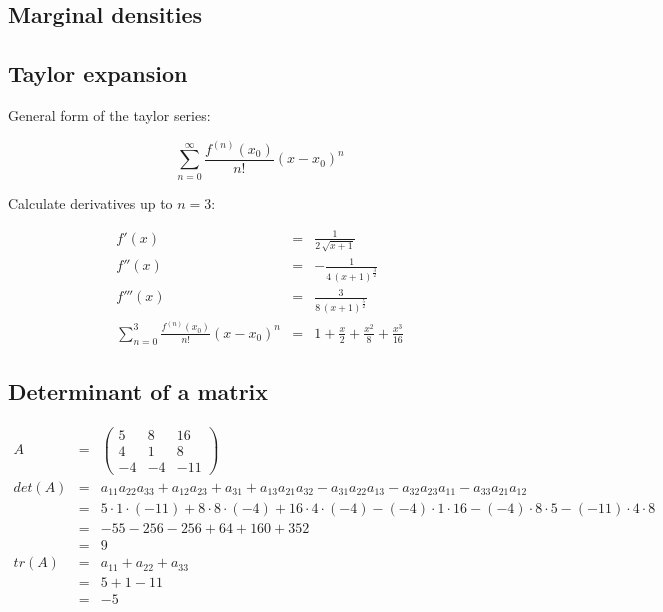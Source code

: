 \documentclass[11pt,a4paper]{article}
\begin{document}
\subsection{Marginal densities}

\subsection{Taylor expansion}

General form of the taylor series:

\begin{displaymath}
\sum_{n=0}^\infty \frac{f^{(n)}(x_0)}{n!} (x - x_0)^n
\end{displaymath}

Calculate derivatives up to $n=3$:

\begin{eqnarray*}
f'(x)   &   = & \frac{1}{2 \, \sqrt{x + 1}}\\
f''(x)  &   = & - \frac{1}{4 \, (x + 1)^\frac{3}{2}}\\
f'''(x) &   = & \frac{3}{8 \, (x + 1)^\frac{5}{2}}\\
\sum_{n=0}^3 \frac{f^{(n)}(x_0)}{n!} (x - x_0)^n
        &   = & 1 + \frac{x}{2} + \frac{x^2}{8} + \frac{x^3}{16}
\end{eqnarray*}

\subsection{Determinant of a matrix}

\begin{eqnarray*}
A   &   = & \begin{pmatrix}
  5 &   8 &  16\\
  4 &   1 &   8\\
 -4 &  -4 & -11
\end{pmatrix}\\
det(A)  &   = & a_{11} a_{22} a_{33} + a_{12} a_{23} + a_{31} + a_{13} a_{21} a_{32}
            - a_{31} a_{22} a_{13} - a_{32} a_{23} a_{11} - a_{33} a_{21} a_{12}\\
        &   = & 5 \cdot 1 \cdot (-11) + 8 \cdot 8 \cdot (-4) + 16 \cdot 4 \cdot (-4)
            - (-4) \cdot 1 \cdot 16 - (-4) \cdot 8 \cdot 5 - (-11) \cdot 4 \cdot 8\\
        &   = & -55 - 256 - 256 + 64 + 160 + 352\\
        &   = & 9\\
tr(A)   &   = & a_{11} + a_{22} + a_{33}\\
        &   = & 5 + 1 - 11\\
        &   = & -5
\end{eqnarray*}
\end{document}
